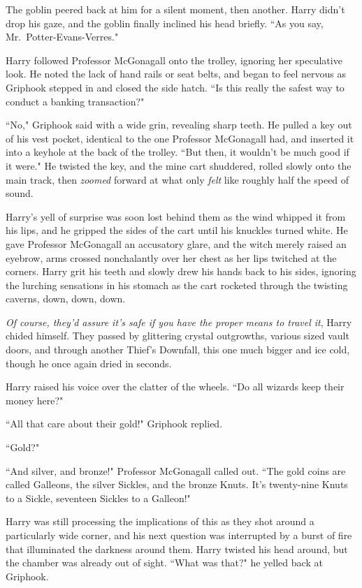 The goblin peered back at him for a silent moment, then
another. Harry didn't drop his gaze, and the goblin finally
inclined his head briefly. ``As you say, Mr.~Potter-Evans-Verres."

Harry followed Professor McGonagall onto the trolley,
ignoring her speculative look. He noted the lack of hand
rails or seat belts, and began to feel nervous as Griphook
stepped in and closed the side hatch. ``Is this really the
safest way to conduct a banking transaction?"

``No," Griphook said with a wide grin, revealing sharp teeth.
He pulled a key out of his vest pocket, identical to the
one Professor McGonagall had, and inserted it into a
keyhole at the back of the trolley. ``But then, it wouldn't
be much good if it were." He twisted the key, and the
mine cart shuddered, rolled slowly onto the main track,
then \emph{zoomed} forward at what only \emph{felt} like roughly half
the speed of sound.

Harry's yell of surprise was soon lost behind them as the
wind whipped it from his lips, and he gripped the sides of
the cart until his knuckles turned white. He gave Professor
McGonagall an accusatory glare, and the witch merely
raised an eyebrow, arms crossed nonchalantly over her
chest as her lips twitched at the corners. Harry grit his
teeth and slowly drew his hands back to his sides, ignoring
the lurching sensations in his stomach as the cart rocketed
through the twisting caverns, down, down, down.

\emph{Of course, they'd assure it's safe if you have the proper
means to travel it}, Harry chided himself. They passed by
glittering crystal outgrowths, various sized vault doors, and
through another Thief's Downfall, this one much bigger and
ice cold, though he once again dried in seconds.

Harry raised his voice over the clatter of the wheels. ``Do
all wizards keep their money here?"

``All that care about their gold!" Griphook replied.

``Gold?"

``And silver, and bronze!" Professor McGonagall called out.
``The gold coins are called Galleons, the silver Sickles, and
the bronze Knuts. It's twenty-nine Knuts to a Sickle,
seventeen Sickles to a Galleon!"

Harry was still processing the implications of this as they
shot around a particularly wide corner, and his next
question was interrupted by a burst of fire that illuminated
the darkness around them. Harry twisted his head around,
but the chamber was already out of sight. ``What was
that?" he yelled back at Griphook.

